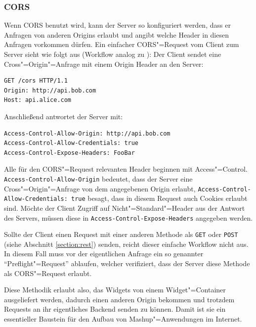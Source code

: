\subsubsection*{\ac{CORS}}
Wenn \acl{CORS} benutzt wird, kann der Server so konfiguriert werden, dass er Anfragen von anderen Origins erlaubt und angibt welche Header in diesen Anfragen vorkommen dürfen. Ein einfacher \ac{CORS}"=Request vom Client zum Server sieht wie folgt aus (Workflow analog zu \cite{Hossain2012}):
Der Client sendet eine Cross"=Origin"=Anfrage mit einem Origin Header an den Server:
\begin{lstlisting}
GET /cors HTTP/1.1
Origin: http://api.bob.com
Host: api.alice.com
\end{lstlisting}
Anschließend antwortet der Server mit:
\begin{lstlisting}
Access-Control-Allow-Origin: http://api.bob.com
Access-Control-Allow-Credentials: true
Access-Control-Expose-Headers: FooBar
\end{lstlisting}
Alle für den \ac{CORS}"=Request relevanten Header beginnen mit Access"=Control.\\ \texttt{Access\allowbreak -Control\allowbreak -Allow\allowbreak -Origin} bedeutet, dass der Server eine Cross"=Origin"=Anfrage von dem angegebenen Origin erlaubt, \texttt{Access\allowbreak -Control\allowbreak -Allow\allowbreak -Credentials: true} besagt, dass in diesem Request auch Cookies erlaubt sind. Möchte der Client Zugriff auf Nicht"=Standard"=Header aus der Antwort des Servers, müssen diese in \texttt{Access\allowbreak -Control\allowbreak -Expose\allowbreak -Headers} angegeben werden.

Sollte der Client einen Request mit einer anderen Methode als \texttt{GET} oder \texttt{POST} (siehe Abschnitt \ref{section:rest}) senden, reicht dieser einfache Workflow nicht aus. In diesem Fall muss vor der eigentlichen Anfrage ein so genannter "`Preflight"=Request"' ablaufen, welcher verifiziert, dass der Server diese Methode als \ac{CORS}"=Request erlaubt.

Diese Methodik erlaubt also, das Widgets von einem Widget"=Container ausgeliefert werden, dadurch einen anderen Origin bekommen und trotzdem Requests an ihr eigentliches Backend senden zu können. Damit ist sie ein essentieller Baustein für den Aufbau von Mashup"=Anwendungen im Internet.

